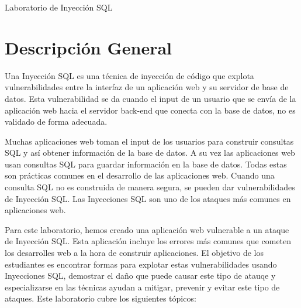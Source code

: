 
\newcommand{\commonfolder}{../../common-files}
\newcommand{\webcommon}{../Web_Common}







\newcommand{\sqlFigs}{./Figs}





\begin{center}
{\LARGE Laboratorio de Inyección SQL }
\end{center}



\section{Descripción General}

Una Inyección SQL es una técnica de inyección de código que explota vulnerabilidades entre la interfaz de un aplicación web y su servidor de base de datos. Esta vulnerabilidad se da cuando el input de un usuario que se envía de la aplicación web hacia el servidor back-end que conecta con la base de datos, no es validado de forma adecuada.

Muchas aplicaciones web toman el input de los usuarios para construir consultas SQL y así obtener información de la base de datos. A su vez las aplicaciones web usan consultas SQL para guardar información en la base de datos. Todas estas son prácticas comunes en el desarrollo de las aplicaciones web. Cuando una consulta SQL no es construida de manera segura, se pueden dar vulnerabilidades de Inyección SQL.
Las Inyecciones SQL son uno de los ataques más comunes en aplicaciones web.

Para este laboratorio, hemos creado una aplicación web vulnerable a un ataque de Inyección SQL. Esta aplicación incluye los errores más comunes que cometen los desarrolles web a la hora de construir aplicaciones.
El objetivo de los estudiantes es encontrar formas para explotar estas vulnerabilidades usando Inyecciones SQL, demostrar el daño que puede causar este tipo de atauqe y especializarse en las técnicas ayudan a mitigar, prevenir y evitar este tipo de ataques.
Este laboratorio cubre los siguientes tópicos:

